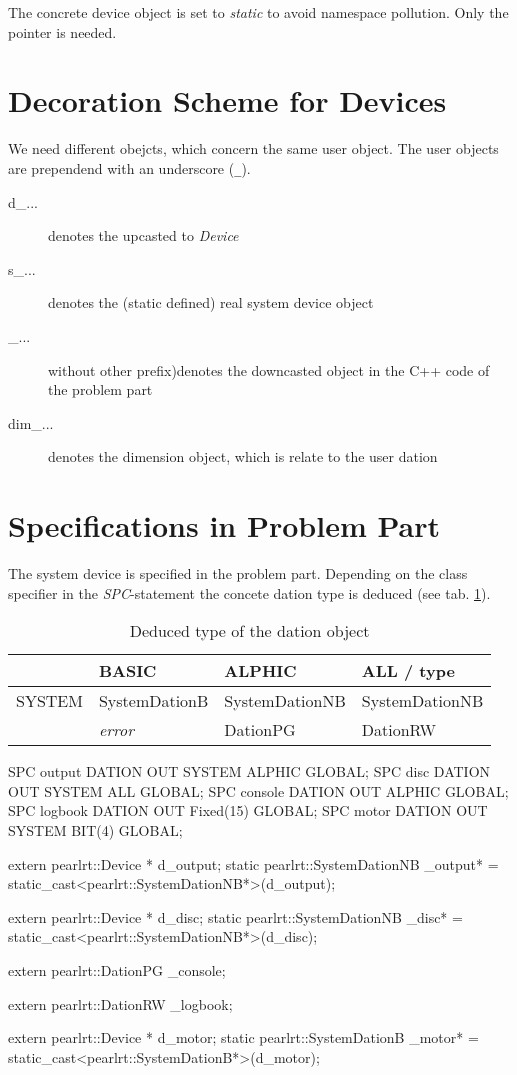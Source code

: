 The concrete device object is set to {\em static} to avoid namespace pollution.
Only the pointer is needed.

\section{Decoration Scheme for Devices}
We need different obejcts, which concern the same user object.
The user objects are prependend with an underscore (\verb|_|).

\begin{description}
\item[d\_...] denotes the upcasted to {\em Device} 
\item[s\_...] denotes the (static defined) real system device object
\item[\_...] without other prefix)denotes the downcasted object in 
     the C++ code of the problem part
\item[dim\_...] denotes the dimension object, which is relate to the 
   user dation
\end{description}

\section{Specifications in Problem Part}
The system device is specified in the problem part.
Depending on the class specifier in the {\em SPC}-statement the concete 
dation type is deduced (see tab. \ref{dationTypes}).

\begin{table}[bpht]
\begin{tabular}{l|l|l|l}
  & BASIC & ALPHIC & ALL / type \\
\hline
SYSTEM & SystemDationB & SystemDationNB & SystemDationNB \\
 & {\em error} & DationPG & DationRW \\
\hline
\end{tabular}
\caption{Deduced type of the dation object}
\label{dationTypes}
\end{table}


\begin{PEARLCode}
SPC output DATION OUT SYSTEM ALPHIC GLOBAL;
SPC disc DATION OUT SYSTEM ALL GLOBAL;
SPC console DATION OUT ALPHIC GLOBAL;
SPC logbook DATION OUT Fixed(15) GLOBAL;
SPC motor DATION OUT SYSTEM BIT(4) GLOBAL;
\end{PEARLCode}

\begin{CppCode}
extern pearlrt::Device * d_output;
static pearlrt::SystemDationNB _output* = 
             static_cast<pearlrt::SystemDationNB*>(d_output);

extern pearlrt::Device * d_disc;
static pearlrt::SystemDationNB _disc* = 
             static_cast<pearlrt::SystemDationNB*>(d_disc);

extern pearlrt::DationPG _console;

extern pearlrt::DationRW _logbook;

extern pearlrt::Device * d_motor;
static pearlrt::SystemDationB _motor* = 
             static_cast<pearlrt::SystemDationB*>(d_motor);
\end{CppCode}

